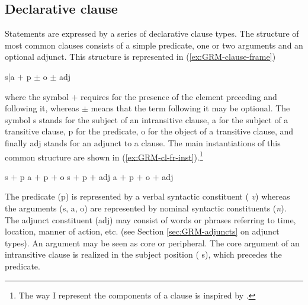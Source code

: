 \subsection{Declarative clause}
\label{sec:GRM-decl-clause}

Statements are expressed by a series of declarative clause types. The structure
of most common clauses consists of  a simple predicate, one or two arguments and
an optional adjunct. This structure is represented in
(\ref{ex:GRM-clause-frame})


\ea\label{ex:GRM-clause-frame}
 {\sc s|a}  $+$ {\sc p} $\pm$ {\sc o} $\pm$ {\sc adj} 
\z

where the symbol $+$  requires for the presence of the element preceding
and following it,  whereas  $\pm$ means that the term following it may be
optional.
The
symbol {\sc s} stands for the subject of an intransitive clause,  {\sc a} 
for the subject of a transitive clause, {\sc p}  for the predicate,  {\sc
o}  for the object of a transitive clause, and finally {\sc adj}
stands for an adjunct to a clause. The main instantiations  of this common
structure are shown in  (\ref{ex:GRM-cl-fr-inst}).\footnote{The way I represent
the components of a clause is inspired by \citet[31]{Bonv88}.}


\ea\label{ex:GRM-cl-fr-inst}

\ea\label{ex:GRM-cl-fr-inst-s-p}
 {\sc s}  $+$ {\sc p} 
\ex\label{ex:GRM-cl-fr-inst-s-p-o}
 {\sc a}  $+$ {\sc p} $+$ {\sc o}
\ex\label{ex:GRM-cl-fr-inst-s-p-adj}
 {\sc s}  $+$ {\sc p}  $+$ {\sc adj} 
 \ex\label{ex:GRM-cl-fr-inst-s-p-o-adj}
 {\sc a}  $+$ {\sc p} $+$ {\sc o} $+$ {\sc adj} 

\z
\z


The predicate ({\sc p})  is represented by a verbal syntactic constituent ({\it
v}) whereas  the arguments ({\sc s, a, o}) are represented by nominal syntactic
constituents   ({\it n}).  The adjunct constituent  ({\sc adj}) may consist of 
words or phrases referring to time, location, manner of action, etc.  (see
Section \ref{sec:GRM-adjuncts} on adjunct types).  An
argument may be seen as core or peripheral.  The core
argument of an intransitive clause is realized in the subject position ({\sc
s}), which
precedes the predicate. 



